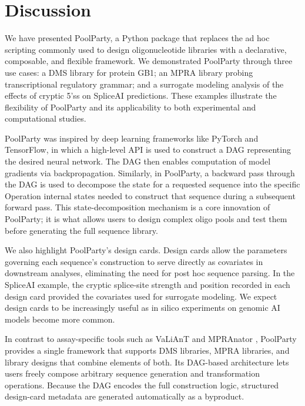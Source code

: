 \documentclass[pdflatex,sn-vancouver-num,referee,lineno,oneside]{sn-jnl}
\begin{document}
\section{Discussion}\label{sec:discussion}

We have presented PoolParty, a Python package that replaces the ad hoc scripting commonly used to design oligonucleotide libraries with a declarative, composable, and flexible framework. We demonstrated PoolParty through three use cases: a DMS library for protein GB1; an MPRA library probing transcriptional regulatory grammar; and a surrogate modeling analysis of the effects of cryptic 5'ss on SpliceAI predictions. These examples illustrate the flexibility of PoolParty and its applicability to both experimental and computational studies.

PoolParty was inspired by deep learning frameworks like PyTorch and TensorFlow, in which a high-level API is used to construct a DAG representing the desired neural network. The DAG then enables computation of model gradients via backpropagation. Similarly, in PoolParty, a backward pass through the DAG is used to decompose the state for a requested sequence into the specific Operation internal states needed to construct that sequence during a subsequent forward pass. This state-decomposition mechanism is a core innovation of PoolParty; it is what allows users to design complex oligo pools and test them before generating the full sequence library.

We also highlight PoolParty's design cards. Design cards allow the parameters governing each sequence's construction to serve directly as covariates in downstream analyses, eliminating the need for post hoc sequence parsing. In the SpliceAI example, the cryptic splice-site strength and position recorded in each design card provided the covariates used for surrogate modeling. We expect design cards to be increasingly useful as in silico experiments on genomic AI models become more common.

In contrast to assay-specific tools such as VaLiAnT \citep{Barbon2022th} and MPRAnator \citep{GeorgakopoulosSoares2017gb}, PoolParty provides a single framework that supports DMS libraries, MPRA libraries, and library designs that combine elements of both. Its DAG-based architecture lets users freely compose arbitrary sequence generation and transformation operations. Because the DAG encodes the full construction logic, structured design-card metadata are generated automatically as a byproduct.
\end{document}
